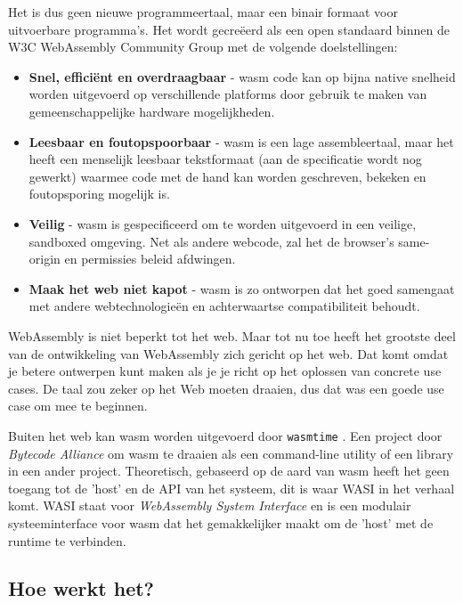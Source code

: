 Het is dus geen nieuwe programmeertaal, maar een binair formaat voor uitvoerbare programma’s. Het
wordt gecreëerd als een open standaard binnen de W3C WebAssembly Community Group met de volgende
doelstellingen: 
\begin{itemize}
  \item \textbf{Snel, efficiënt en overdraagbaar} - wasm code kan op bijna native snelheid worden uitgevoerd
    op verschillende platforms door gebruik te maken van gemeenschappelijke hardware mogelijkheden. 

  \item \textbf{Leesbaar en foutopspoorbaar} - wasm is een lage assembleertaal, maar het heeft een menselijk
    leesbaar tekstformaat (aan de specificatie wordt nog gewerkt) waarmee code met de hand kan
    worden geschreven, bekeken en foutopsporing mogelijk is. 

  \item \textbf{Veilig} - wasm is gespecificeerd om te worden uitgevoerd in een veilige, sandboxed omgeving.
    Net als andere webcode, zal het de browser's same-origin en permissies beleid afdwingen. 

  \item \textbf{Maak het web niet kapot} - wasm is zo ontworpen dat het goed samengaat met andere
    webtechnologieën en achterwaartse compatibiliteit behoudt.
\end{itemize}

WebAssembly is niet beperkt tot het web. Maar tot nu toe heeft het grootste deel van de
ontwikkeling van WebAssembly zich gericht op het web. Dat komt omdat je betere ontwerpen kunt maken
als je je richt op het oplossen van concrete use cases. De taal zou zeker op het Web moeten draaien,
dus dat was een goede use case om mee te beginnen. \cite{wasm_interfaces}

\clearpage

Buiten het web kan wasm worden uitgevoerd door \texttt{wasmtime} \cite{wasm_time}. Een
project door \textit{Bytecode Alliance} om wasm te draaien als een command-line utility of een
library in een ander project. Theoretisch, gebaseerd op de aard van wasm heeft het geen toegang tot
de 'host' en de API van het systeem, dit is waar WASI in het verhaal komt. WASI staat voor
\textit{WebAssembly System Interface} en is een modulair systeeminterface voor wasm dat het
gemakkelijker maakt om de 'host' met de runtime te verbinden.\cite{wasi}

\subsection{Hoe werkt het?}

